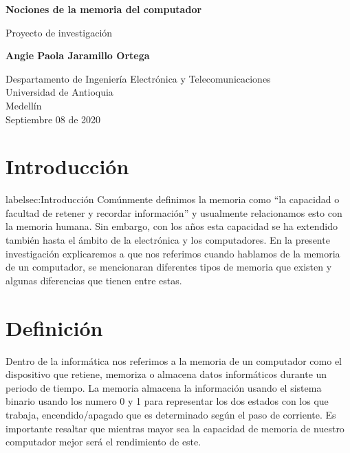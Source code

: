 \documentclass{article}
\begin{document}
\begin{titlepage}
    \begin{center}
        \vspace*{1cm}
            
        \Huge
        \textbf{Nociones de la memoria del computador}
            
        \vspace{0.5cm}
        \LARGE
        Proyecto de investigación
            
        \vspace{1.5cm}
            
        \textbf{Angie Paola Jaramillo Ortega}
            
        \vfill
            
        \vspace{0.8cm}
            
        \Large
        Despartamento de Ingeniería Electrónica y Telecomunicaciones\\
        Universidad de Antioquia\\
        Medellín\\
        Septiembre 08 de 2020
            
    \end{center}
\end{titlepage}

\tableofcontents

\section{Introducción}label{sec:Introducción}
Comúnmente definimos la memoria como “la capacidad o facultad de retener y recordar información”\cite{definicion} y usualmente relacionamos esto con la memoria humana. Sin embargo, con los años esta capacidad se ha extendido también hasta el ámbito de la electrónica y los computadores. En la presente investigación explicaremos a que nos referimos cuando hablamos de la memoria de un computador, se mencionaran diferentes tipos de memoria que existen y algunas diferencias que tienen entre estas.


\section{Definición}
Dentro de la informática nos referimos a la memoria de un computador como el dispositivo que retiene, memoriza o almacena datos informáticos durante un periodo de tiempo. La memoria almacena la información usando el sistema binario usando los numero 0 y 1 para representar los dos estados con los que trabaja, encendido/apagado que es determinado según el paso de corriente. Es importante resaltar que mientras mayor sea la capacidad de memoria de nuestro computador mejor será el rendimiento de este.
\end{document}
